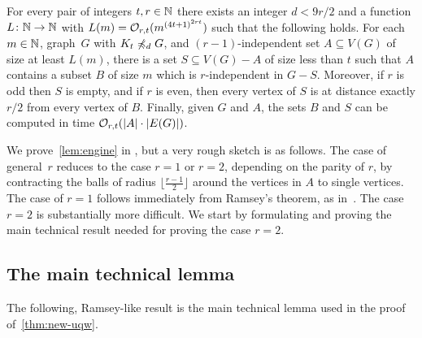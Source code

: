 \begin{lemma}\label{lem:engine}
For every pair of integers $t,r\in \mathbb{N}$ there exists an integer $d<9r/2$ and a function $L\colon \mathbb{N}\to \mathbb{N}$ with $L(m)=\mathcal{O}_{r,t}{(m^{{(4t+1)}^{2rt}})}$ such that the following holds.
For each $m\in \mathbb{N}$, graph~$G$ with $K_t\not\preccurlyeq_{d} G$, and
$(r-1)$-independent set $A\subseteq V(G)$ of size at least $L(m)$, there is a set $S\subseteq V(G)-A$ of size less than $t$ such that $A$ contains a subset $B$ of size $m$ which is $r$-independent in $G-S$.
Moreover, if $r$ is odd then $S$ is empty, and if $r$ is even,
then every vertex of $S$ is at distance exactly $r/2$ from every vertex of $B$.
Finally, given $G$ and $A$, the sets $B$ and $S$ can be computed in time $\mathcal{O}_{r,t}(|A|\cdot |E(G)|)$.
\end{lemma}

We prove~\cref{lem:engine} in , but  a very rough sketch is as follows.
The  case of general~$r$ reduces to the case $r=1$ or $r=2$, depending on the parity of $r$,
by contracting the balls of radius $\lfloor \frac {r-1} 2\rfloor $ around the vertices in $A$ to single vertices.
The case of $r=1$ follows immediately from Ramsey's theorem, as in~\cite{nevsetvril2011nowhere}.
The case $r=2$ is substantially more difficult.
We start by formulating and proving the main technical result needed for proving the case $r=2$.







\subsection{The main technical lemma}
\label{sec:main-tech}

The following, Ramsey-like result is the main technical lemma used in the proof of~\cref{thm:new-uqw}. 

